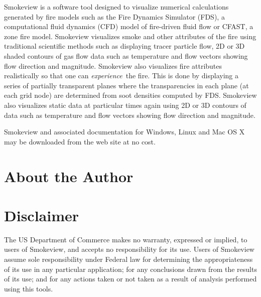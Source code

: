 \documentclass[11pt,twoside]{book}
\begin{document}
Smokeview is a software tool designed to visualize numerical
calculations generated by fire models such as the Fire Dynamics
Simulator (FDS), a computational fluid dynamics (CFD) model of
fire-driven fluid flow or CFAST, a zone fire model. Smokeview
visualizes smoke and other attributes of the fire using
traditional scientific methods such as displaying tracer particle
flow, 2D or 3D shaded contours of gas flow data such as
temperature and flow vectors showing flow direction and magnitude.
Smokeview also visualizes fire attributes realistically so that
one can {\em experience}\ the fire. This is done by displaying a
series of partially transparent planes where the transparencies in
each plane (at each grid node) are determined from soot densities
computed by FDS.  Smokeview also visualizes static data at
particular times again using 2D or 3D contours of data such as
temperature and flow vectors showing flow direction and magnitude.

Smokeview and associated documentation for Windows, Linux and Mac
OS X may be downloaded from the web site {\bf
{}} at no cost.


\chapter{About the Author}

\begin{description}
\gforneybio
\end{description}


\chapter{Disclaimer}

The US Department of Commerce makes no warranty,
expressed or implied, to users of Smokeview, and accepts no
responsibility for its use. Users of Smokeview assume sole
responsibility under Federal law for determining the
appropriateness of its use in any particular application; for any
conclusions drawn from the results of its use; and for any actions
taken or not taken as a result of analysis performed using this
tools.
\end{document}
